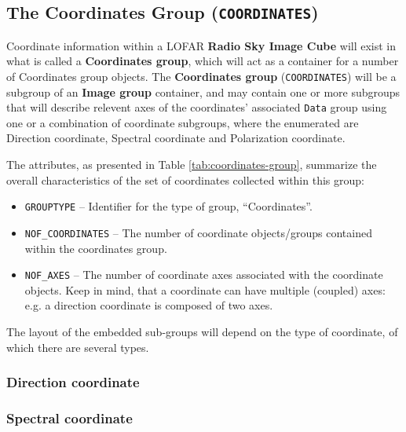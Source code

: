 \documentclass[a4paper,10pt,bibtotoc]{scrartcl}
\begin{document}

\subsection{The Coordinates Group ({\tt COORDINATES})}
\label{sec:coordinates group}

Coordinate information within a LOFAR \textbf{Radio Sky Image Cube}
will exist in what is called a \textbf{Coordinates group}, which will
act as a container for a number of Coordinates group objects.
The \textbf{Coordinates group} (\verb|COORDINATES|) will be a subgroup
of an \textbf{Image group} container, and may contain one or more subgroups that will
describe relevent axes of the coordinates' associated \texttt{Data}
group using one or a combination of coordinate subgroups, where the
enumerated are Direction coordinate, Spectral coordinate and
Polarization coordinate.




The attributes, as presented in Table \ref{tab:coordinates-group},  summarize the
overall characteristics of the set of coordinates collected within this group:
\begin{itemize}
\item \verb|GROUPTYPE| -- Identifier for the type of group, ``Coordinates''.
\item \verb|NOF_COORDINATES| -- The number of coordinate
  objects/groups contained within the coordinates group.
\item \verb|NOF_AXES| -- The number of coordinate axes associated with the
  coordinate objects. Keep in mind, that a coordinate can have multiple (coupled)
  axes:  e.g. a direction coordinate is composed of two axes.
\end{itemize}

The layout of the embedded sub-groups will depend on the type of coordinate, of
which there are several types.

\subsubsection{Direction coordinate}
\label{sec:coord-direction}



\subsubsection{Spectral coordinate}
\label{sec:coord-spectral}
\end{document}
